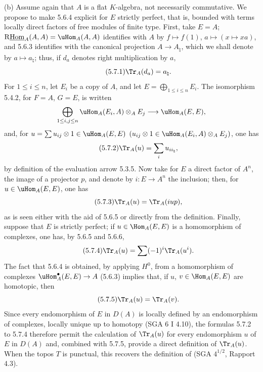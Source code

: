 (b) Assume again that $A$ is a flat $K$-algebra, not necessarily commutative. We propose to make 5.6.4 explicit for $E$ strictly perfect, that is, bounded with terms locally direct factors of free modules of finite type. First, take $E=A$; $\mathrm{R}\underline{\mathrm{Hom}}_A(A,A)=\uHom_A(A,A)$ identifies with $A$ by $f\mapsto f(1)$, $a\mapsto(x\mapsto xa)$, and 5.6.3 identifies with the canonical projection $A\to A_\natural$, which we shall denote by $a\mapsto a_\natural$; thus, if $d_a$ denotes right multiplication by $a$,
\begin{equation}\tag{5.7.1}
\Tr_A(d_a)=a_\natural.
\end{equation}
For $1\le i\le n$, let $E_i$ be a copy of $A$, and let $E=\bigoplus_{1\le i\le n}E_i$. The isomorphism 5.4.2, for $F=A$, $G=E$, is written
\[
\bigoplus_{1\le i,j\le n}\uHom_A(E_i,A)\otimes_AE_j\longrightarrow\uHom_A(E,E),
\]
and, for $u=\sum u_{ij}\otimes 1\in\uHom_A(E,E)$ $(u_{ij}\otimes 1\in\uHom_A(E_i,A)\otimes_A E_j)$, one has
\begin{equation}\tag{5.7.2}
\Tr_A(u)=\sum_i u_{ii_\natural},
\end{equation}
by definition of the evaluation arrow 5.3.5. Now take for $E$ a direct factor of $A^n$, the image of a projector $p$, and denote by $i:E\to A^n$ the inclusion; then, for $u\in\uHom_A(E,E)$, one has
\begin{equation}\tag{5.7.3}
\Tr_A(u)=\Tr_A(iup),
\end{equation}
as is seen either with the aid of 5.6.5 or directly from the definition. Finally, suppose that $E$ is strictly perfect; if $u\in\Hom_A(E,E)$ is a homomorphism of complexes, one has, by 5.6.5 and 5.6.6,
\begin{equation}\tag{5.7.4}
\Tr_A(u)=\sum(-1)^i\Tr_A(u^i).
\end{equation}
The fact that 5.6.4 is obtained, by applying $H^0$, from a homomorphism of complexes $\uHom_A^\bullet(E,E)\to A$ (5.6.3) implies that, if $u$, $v\in\Hom_A(E,E)$ are homotopic, then
\begin{equation}\tag{5.7.5}
\Tr_A(u)=\Tr_A(v).
\end{equation}
Since every endomorphism of $E$ in $D(A)$ is locally defined by an endomorphism of complexes, locally unique up to homotopy (SGA 6 I 4.10), the formulas 5.7.2 to 5.7.4 therefore permit the calculation of $\Tr_A(u)$ for every endomorphism $u$ of $E$ in $D(A)$ and, combined with 5.7.5, provide a direct definition of $\Tr_A(u)$. When the topos $T$ is punctual, this recovers the definition of (SGA $4^{1/2}$, Rapport 4.3).

